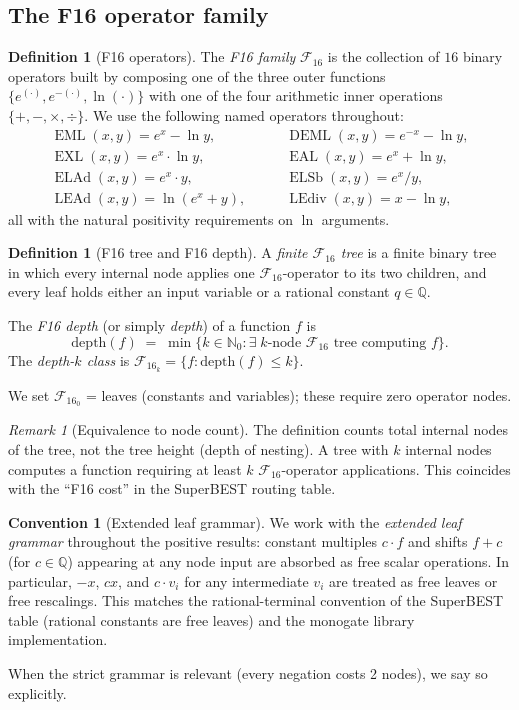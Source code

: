 \documentclass[12pt,a4paper]{article}
\theoremstyle{definition}
\newtheorem{definition}[theorem]{Definition}
\newtheorem{convention}[theorem]{Convention}
\theoremstyle{remark}
\newtheorem{remark}[theorem]{Remark}
\newcommand{\EML}{\operatorname{EML}}
\newcommand{\EXL}{\operatorname{EXL}}
\newcommand{\EAL}{\operatorname{EAL}}
\newcommand{\DEML}{\operatorname{DEML}}
\newcommand{\ELAd}{\operatorname{ELAd}}
\newcommand{\ELSb}{\operatorname{ELSb}}
\newcommand{\LEAd}{\operatorname{LEAd}}
\newcommand{\LEdiv}{\operatorname{LEdiv}}
\newcommand{\F}{\mathcal{F}_{16}}
\newcommand{\Q}{\mathbb{Q}}
\newcommand{\N}{\mathbb{N}}
\begin{document}
\subsection{The F16 operator family}

\begin{definition}[F16 operators]
\label{def:F16}
The \emph{F16 family} $\F$ is the collection of $16$ binary operators
built by composing one of the three outer functions $\{e^{(\cdot)}, e^{-(\cdot)}, \ln(\cdot)\}$
with one of the four arithmetic inner operations $\{+,-,\times,\div\}$.
We use the following named operators throughout:
\[
\begin{array}{ll}
  \EML(x,y)  = e^x - \ln y, &\qquad \DEML(x,y) = e^{-x} - \ln y, \\[4pt]
  \EXL(x,y)  = e^x \cdot \ln y, &\qquad \EAL(x,y) = e^x + \ln y, \\[4pt]
  \ELAd(x,y) = e^x \cdot y,     &\qquad \ELSb(x,y) = e^x / y, \\[4pt]
  \LEAd(x,y) = \ln(e^x + y),    &\qquad \LEdiv(x,y) = x - \ln y,
\end{array}
\]
all with the natural positivity requirements on $\ln$ arguments.
\end{definition}

\begin{definition}[F16 tree and F16 depth]
\label{def:depth}
A \emph{finite $\F$ tree} is a finite binary tree in which every internal node
applies one $\F$-operator to its two children, and every leaf holds either an
input variable or a rational constant $q\in\Q$.

The \emph{F16 depth} (or simply \emph{depth}) of a function $f$ is
\[
  \mathrm{depth}(f)
  \;=\; \min\bigl\{k \in \N_0 : \exists\;\text{$k$-node $\F$ tree computing $f$}\bigr\}.
\]
The \emph{depth-$k$ class} is $\F_k = \{f : \mathrm{depth}(f) \leq k\}$.

We set $\F_0$ = leaves (constants and variables); these require zero operator nodes.
\end{definition}

\begin{remark}[Equivalence to node count]
The definition counts total internal nodes of the tree, not the tree height
(depth of nesting).  A tree with $k$ internal nodes computes a function
requiring at least $k$ $\F$-operator applications.  This coincides with the
``F16 cost'' in the SuperBEST routing table.
\end{remark}

\begin{convention}[Extended leaf grammar]
\label{conv:extended}
We work with the \emph{extended leaf grammar} throughout the positive results:
constant multiples $c \cdot f$ and shifts $f + c$ (for $c\in\Q$) appearing
at any node input are absorbed as free scalar operations.  In particular,
$-x$, $cx$, and $c\cdot v_i$ for any intermediate $v_i$ are treated as free
leaves or free rescalings.  This matches the rational-terminal convention of
the SuperBEST table (rational constants are free leaves) and the monogate
library implementation.

When the strict grammar is relevant (every negation costs 2 nodes), we say so
explicitly.
\end{convention}
\end{document}
